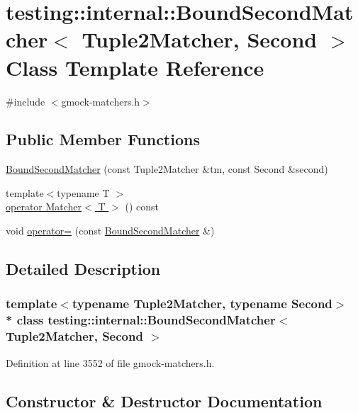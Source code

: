 \hypertarget{classtesting_1_1internal_1_1_bound_second_matcher}{}\section{testing\+:\+:internal\+:\+:Bound\+Second\+Matcher$<$ Tuple2\+Matcher, Second $>$ Class Template Reference}
\label{classtesting_1_1internal_1_1_bound_second_matcher}


{\ttfamily \#include $<$gmock-\/matchers.\+h$>$}

\subsection*{Public Member Functions}
\begin{DoxyCompactItemize}
\item 
\hyperlink{classtesting_1_1internal_1_1_bound_second_matcher_af9d0d4b50a3b9883ff26312922b9f639}{Bound\+Second\+Matcher} (const Tuple2\+Matcher \&tm, const Second \&second)
\item 
{\footnotesize template$<$typename T $>$ }\\\hyperlink{classtesting_1_1internal_1_1_bound_second_matcher_aebcba80b915b34be2c8d46e12b0b669a}{operator Matcher$<$ T $>$} () const 
\item 
void \hyperlink{classtesting_1_1internal_1_1_bound_second_matcher_a62f714cb2c7388cb582aaae0110bfe49}{operator=} (const \hyperlink{classtesting_1_1internal_1_1_bound_second_matcher}{Bound\+Second\+Matcher} \&)
\end{DoxyCompactItemize}


\subsection{Detailed Description}
\subsubsection*{template$<$typename Tuple2\+Matcher, typename Second$>$\\*
class testing\+::internal\+::\+Bound\+Second\+Matcher$<$ Tuple2\+Matcher, Second $>$}



Definition at line 3552 of file gmock-\/matchers.\+h.



\subsection{Constructor \& Destructor Documentation}
